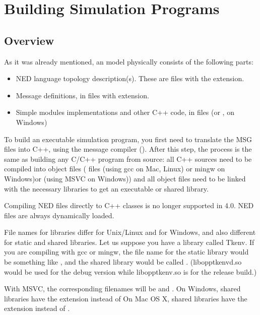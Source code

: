 \chapter{Building Simulation Programs}
\label{cha:building-simulation-programs}

\section{Overview}

As it was already mentioned, an {\opp} model physically consists of
the following parts:

\begin{itemize}
  \item{NED language topology description(s). These
      are files with the  extension.}
  \item{Message definitions, in files
      with  extension.}
  \item{Simple modules implementations and other C++ code, in 
        files (or , on Windows)}
\end{itemize}


To build an executable simulation program,
you first need to translate the MSG files
into C++, using the message compiler ().
After this step, the process is the same as building any C/C++
program from source: all C++ sources need to be compiled into object files
( files (using gcc on Mac, Linux) or mingw on Windows)\ifcommercial or  (using MSVC on Windows)) \fi
and all object files need to be linked with the necessary libraries to get
an executable or shared library.

\begin{note}
Compiling NED files directly to C++ classes is no longer supported in
{\opp} 4.0. NED files are always dynamically loaded.
\end{note}

File names for libraries differ for Unix/Linux and for Windows,
and also different for static and shared libraries.
Let us suppose you have a library called Tkenv.
If you are compiling with gcc or mingw, the file name for the static library
would be something like ,
and the shared library would be called .
(libopptkenvd.so would be used for the debug version while libopptkenv.so
is for the release build.)

\begin{note}
\ifcommercial With MSVC, the corresponding filenames will be  and .\fi
On Windows, shared libraries have the  extension instead of 
On Mac OS X, shared libraries have the  extension instead of .
\end{note}

